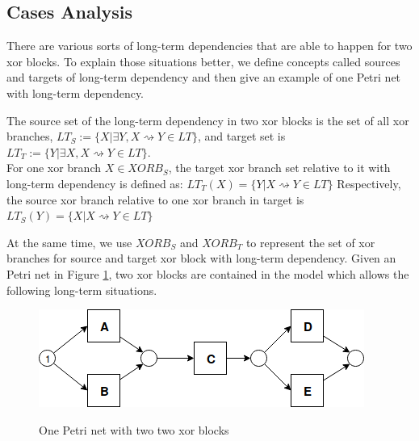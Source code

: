 \subsection{Cases Analysis}
There are various sorts of long-term dependencies that are able to happen for two xor blocks. To explain those situations better, we define concepts called sources and targets of long-term dependency and then give an example of one Petri net with long-term dependency.
\begin{definition}
	The source set of the long-term dependency in two xor blocks is the set of all  xor branches, $LT_S:= \{X \vert \exists Y, X\rightsquigarrow Y  \in LT \} $, and target set is $LT_T:= \{Y \vert \exists X, X\rightsquigarrow Y \in LT \} $. \\
	For one xor branch $X \in XORB_S$, the target xor branch set relative to it with long-term dependency is defined as:
	$ LT_T(X)= \{Y \vert  X\rightsquigarrow Y \in LT \}$
	Respectively, the source xor branch relative to one xor branch in target is
	$ LT_S(Y)= \{X \vert  X\rightsquigarrow Y \in LT \}$
\end{definition}
At the same time, we use $XORB_S $ and $XORB_T$ to represent the set of xor branches for source and target xor block with long-term dependency.
Given an Petri net in Figure \ref{fig:seq-2-original}, two xor blocks are contained in the model which allows the following long-term situations.
\begin{figure}
	\centering
	\includegraphics[width=\linewidth]{figures/algorithm/LT_Seq_01_Original.png}
	\label{fig:seq-2-original}
	\caption{One Petri net with two two xor blocks}
\end{figure}
